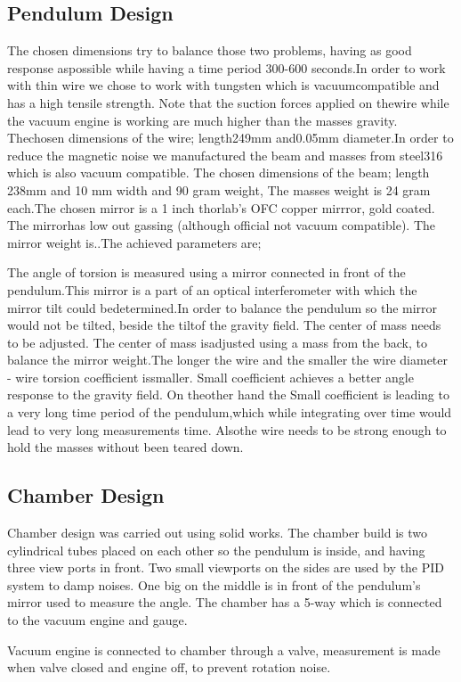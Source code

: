 \documentclass[\main/master.tex]{subfiles}
\begin{document}
\subsection{Pendulum Design}
The chosen dimensions try to balance those two problems, having as good response aspossible while having a time period 300-600 seconds.In order to work with thin wire we chose to work with tungsten which is vacuumcompatible and has a high tensile strength. Note that the suction forces applied on thewire while the vacuum engine is working are much higher than the masses gravity. Thechosen dimensions of the wire; length249mm and0.05mm diameter.In order to reduce the magnetic noise we manufactured the beam and masses from steel316 which is also vacuum compatible. The chosen dimensions of the beam; length 238mm and 10 mm width and 90 gram weight, The masses weight is 24 gram each.The chosen mirror is a 1 inch thorlab’s OFC copper mirrror, gold coated. The mirrorhas low out gassing (although official not vacuum compatible). The mirror weight is..The achieved parameters are;
\par
The angle of torsion is measured using a mirror connected in front of the pendulum.This mirror is a part of an optical interferometer with which the mirror tilt could bedetermined.In order to balance the pendulum so the mirror would not be tilted, beside the tiltof the gravity field. The center of mass needs to be adjusted. The center of mass isadjusted using a mass from the back, to balance the mirror weight.The longer the wire and the smaller the wire diameter - wire torsion coefficient issmaller. Small coefficient achieves a better angle response to the gravity field. On theother hand the Small coefficient is leading to a very long time period of the pendulum,which while integrating over time would lead to very long measurements time. Alsothe wire needs to be strong enough to hold the masses without been teared down.
\subsection{Chamber Design}
Chamber design was carried out using solid works. The chamber build is two cylindrical tubes placed on each other so the pendulum is inside, and having three view ports in front. Two small viewports on the sides are used by the PID system to damp noises. One big on the middle is in front of the pendulum's mirror  used to measure the angle. The chamber has a 5-way which is connected to the vacuum engine and gauge. 
\par
Vacuum engine is connected to chamber through a valve, measurement is made when valve closed and engine off, to prevent rotation noise.
\par
 
\end{document}
